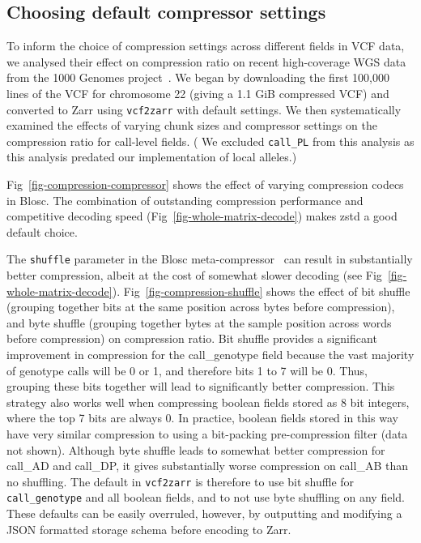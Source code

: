 \documentclass[a4paper,num-refs]{oup-contemporary}
\begin{document}
\subsection{Choosing default compressor settings}
To inform the choice of compression settings across different fields
in VCF data, we analysed their effect on compression ratio on
recent high-coverage WGS data from the 1000 Genomes
project~\citep{byrska2022high}. We began by downloading
the first 100,000 lines of the VCF
for chromosome 22 (giving a 1.1 GiB compressed VCF)
and converted to Zarr using
\texttt{vcf2zarr} with default settings. We then systematically
examined the effects of varying chunk sizes and compressor settings
on the compression ratio for call-level fields. (
We excluded \texttt{call\_PL} from this analysis as this analysis predated 
our implementation of local alleles.)

Fig~\ref{fig-compression-compressor} shows the effect of varying compression
codecs in Blosc. The combination of outstanding compression performance
and competitive decoding speed (Fig~\ref{fig-whole-matrix-decode})
makes zstd a good default choice.

The \texttt{shuffle} parameter in the Blosc meta-compressor~\cite{alted2010modern}
can result in substantially better compression, albeit at the
cost of somewhat slower decoding (see Fig~\ref{fig-whole-matrix-decode}).
Fig~\ref{fig-compression-shuffle} shows the effect of
bit shuffle (grouping together bits at the same position
across bytes before compression), and byte shuffle (grouping together
bytes at the sample position across words before compression)
on compression ratio. Bit shuffle provides a significant
improvement in compression for the call\_genotype field  because
the vast majority of genotype calls will be 0 or 1, and therefore
bits 1 to 7 will be 0. Thus, grouping these bits together will
lead to significantly better compression. This strategy also
works well when compressing boolean fields stored as
8 bit integers, where the top 7 bits are always 0. In practice,
boolean fields stored in this way have very similar compression
to using a bit-packing pre-compression filter (data not shown).
Although byte shuffle leads to somewhat better compression for call\_AD
and call\_DP, it gives substantially worse compression on call\_AB
than no shuffling.
The default in \texttt{vcf2zarr}
is therefore to use bit shuffle for \texttt{call\_genotype}
and all boolean fields, and to not use
byte shuffling on any field. These defaults can be easily
overruled, however, by outputting and modifying a JSON formatted
storage schema before encoding to Zarr.
\end{document}
